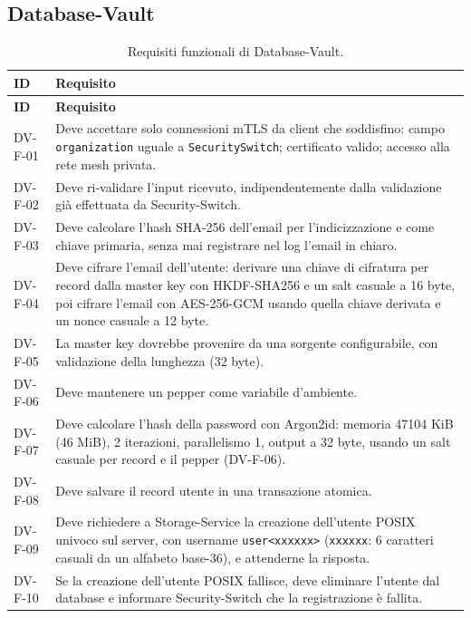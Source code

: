 \subsection{Database-Vault}

\begin{longtable}{p{2.6cm} p{\dimexpr\linewidth-2.6cm-4\tabcolsep\relax}}
\caption{Requisiti funzionali di Database-Vault.} \\
\hline
\textbf{ID} & \textbf{Requisito} \\
\hline
\endfirsthead
\hline
\textbf{ID} & \textbf{Requisito} \\
\hline
\endhead
\hline
\endfoot
\hline
\endlastfoot
DV-F-01 & Deve accettare solo connessioni mTLS da client che soddisfino: campo \texttt{organization} uguale a \texttt{SecuritySwitch}; certificato valido; accesso alla rete mesh privata. \\
DV-F-02 & Deve ri-validare l'input ricevuto, indipendentemente dalla validazione già effettuata da Security-Switch. \\
DV-F-03 & Deve calcolare l'hash SHA-256 dell'email per l'indicizzazione e come chiave primaria, senza mai registrare nel log l'email in chiaro. \\
DV-F-04 & Deve cifrare l'email dell'utente: derivare una chiave di cifratura per record dalla master key con HKDF-SHA256 e un salt casuale a 16 byte, poi cifrare l'email con AES-256-GCM usando quella chiave derivata e un nonce casuale a 12 byte. \\
DV-F-05 & La master key dovrebbe provenire da una sorgente configurabile, con validazione della lunghezza (32 byte). \\
DV-F-06 & Deve mantenere un pepper come variabile d'ambiente. \\
DV-F-07 & Deve calcolare l'hash della password con Argon2id: memoria 47104 KiB (46 MiB), 2 iterazioni, parallelismo 1, output a 32 byte, usando un salt casuale per record e il pepper (DV-F-06). \\
DV-F-08 & Deve salvare il record utente in una transazione atomica. \\
DV-F-09 & Deve richiedere a Storage-Service la creazione dell'utente POSIX univoco sul server, con username \texttt{user<xxxxxx>} (\texttt{xxxxxx}: 6 caratteri casuali da un alfabeto base-36), e attenderne la risposta. \\
DV-F-10 & Se la creazione dell'utente POSIX fallisce, deve eliminare l'utente dal database e informare Security-Switch che la registrazione è fallita. \\

\end{longtable}
